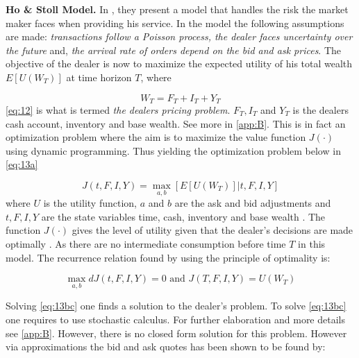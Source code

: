 \documentclass{kththesis}
\theoremstyle{definition}
\begin{document}
\textbf{Ho \& Stoll Model.} In \textcite{ho1981optimal}, they present a model that handles the risk the market maker faces when providing his service. In the model the following assumptions are made: \textit{transactions follow a Poisson process, the dealer faces uncertainty over the future} and, \textit{the arrival rate of orders depend on the bid and ask prices}. The objective of the dealer is now to maximize the expected utility of his total wealth $E[U(W_T)]$ at time horizon $T$, where 

\begin{equation}
    \label{eq:12}
    W_{T} = F_{T} + I_{T} + Y_{T}
\end{equation}
\autoref{eq:12} is what is termed \textit{the dealers pricing problem}. $F_{T}, I_{T}$ and $Y_{T}$ is the dealers cash account, inventory and base wealth. See more in \autoref{app:B}. This is in fact an optimization problem where the aim is to maximize the value function $J(\cdot)$ using dynamic programming. Thus yielding the optimization problem below in \autoref{eq:13a}

\begin{equation}
    \label{eq:13a}
    J(t,F,I,Y) = \underset{a,b}{\max}[E[U(W_T)] | t,F,I,Y]
\end{equation}
where $U$ is the utility function, $a$ and $b$ are the ask and bid adjustments and $t, F, I,Y$ are the state variables time, cash, inventory and base wealth \parencite{o1995market}. The function $J(\cdot)$ gives the level of utility given that the dealer's decisions are made optimally \parencite{o1995market}. As there are no intermediate consumption before time $T$ in this model. The recurrence relation found by using the principle of optimality is:

\begin{equation}
    \label{eq:13bc}
    \underset{a,b}{\max}dJ(t,F,I,Y)=0 \text{ and } 
    J(T,F,I,Y)=U(W_T)
\end{equation}

Solving \autoref{eq:13bc} one finds a solution to the dealer's problem. To solve \autoref{eq:13bc} one requires to use stochastic calculus. For further elaboration and more details see \autoref{app:B}. However, there is no closed form solution for this problem. However via approximations the bid and ask quotes has been shown to be found by:
\end{document}
